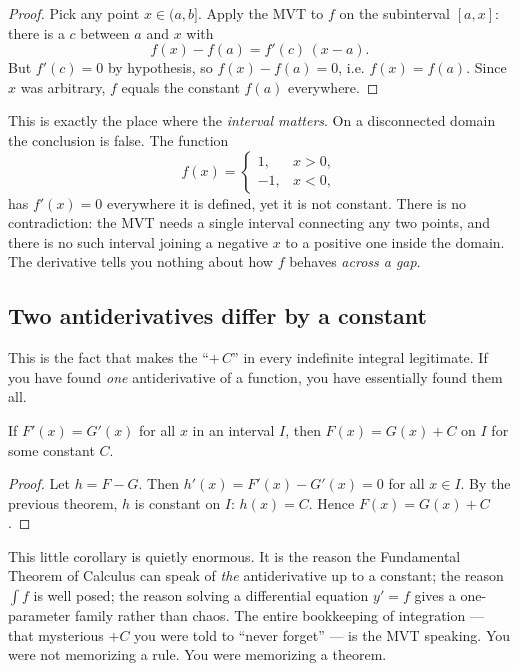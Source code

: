 \begin{proof}
Pick any point $x\in(a,b]$. Apply the MVT to $f$ on the subinterval $[a,x]$: there
is a $c$ between $a$ and $x$ with
\[
  f(x)-f(a)=f'(c)\,(x-a).
\]
But $f'(c)=0$ by hypothesis, so $f(x)-f(a)=0$, i.e. $f(x)=f(a)$. Since $x$ was
arbitrary, $f$ equals the constant $f(a)$ everywhere.
\end{proof}

\begin{trapbox}
This is exactly the place where the \emph{interval matters}. On a disconnected
domain the conclusion is false. The function
\[
  f(x)=\begin{cases}1,& x>0,\\ -1,& x<0,\end{cases}
\]
has $f'(x)=0$ everywhere it is defined, yet it is not constant. There is no
contradiction: the MVT needs a single interval connecting any two points, and there
is no such interval joining a negative $x$ to a positive one inside the domain. The
derivative tells you nothing about how $f$ behaves \emph{across a gap}.
\end{trapbox}

\subsection{Two antiderivatives differ by a constant}

This is the fact that makes the ``$+\,C$'' in every indefinite integral legitimate.
If you have found \emph{one} antiderivative of a function, you have essentially
found them all.

\begin{corollary}\label{ch15:cor-plusC}
If $F'(x)=G'(x)$ for all $x$ in an interval $I$, then $F(x)=G(x)+C$ on $I$ for some
constant $C$.
\end{corollary}

\begin{proof}
Let $h=F-G$. Then $h'(x)=F'(x)-G'(x)=0$ for all $x\in I$. By the previous theorem,
$h$ is constant on $I$: $h(x)=C$. Hence $F(x)=G(x)+C$.
\end{proof}

\begin{aestheticbox}
This little corollary is quietly enormous. It is the reason the Fundamental Theorem
of Calculus can speak of \emph{the} antiderivative up to a constant; the reason
$\int f$ is well posed; the reason solving a differential equation $y'=f$ gives a
one-parameter family rather than chaos. The entire bookkeeping of integration ---
that mysterious $+C$ you were told to ``never forget'' --- is the MVT speaking. You
were not memorizing a rule. You were memorizing a theorem.
\end{aestheticbox}

